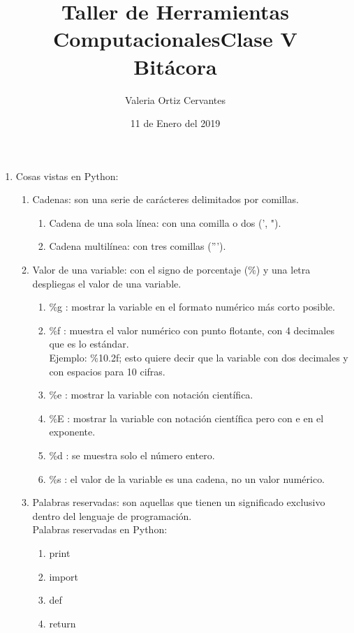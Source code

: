 \documentclass[letterpaper, 12pt, oneside]{article} %
\title{\Huge Taller de Herramientas Computacionales}
\author{Valeria Ortiz Cervantes}
\date{11 de Enero del 2019}
\begin{document}
	\maketitle
	\newpage
	\title{Clase V\\Bitácora\\}
	\begin{enumerate}
		\item Cosas vistas en Python:
		\begin{enumerate}
			\item Cadenas: son una serie de carácteres delimitados por comillas.
			\begin{enumerate}
				\item Cadena de una sola línea: con una comilla o dos (', ").
				\item Cadena multilínea: con tres comillas (''').
			\end{enumerate}
			\item Valor de una variable: con el signo de porcentaje ($\%$) y una letra despliegas el valor de una variable. 
			\begin{enumerate}
				\item $\%$g : mostrar la variable en el formato numérico más corto posible.
				\item $\%$f : muestra el valor numérico con punto flotante, con 4 decimales que es lo estándar.\\Ejemplo: $\%$10.2f; esto quiere decir que la variable con dos decimales y con espacios para 10 cifras.
				\item $\%$e : mostrar la variable con notación científica. 
				\item $\%$E : mostrar la variable con notación científica pero con e en el exponente.
				\item $\%$d : se muestra solo el número entero.
				\item $\%$s : el valor de la variable es una cadena, no un valor numérico.
			\end{enumerate}
			\item Palabras reservadas: son aquellas que tienen un significado exclusivo dentro del lenguaje de programación.\\Palabras reservadas en Python:
			\begin{enumerate}
				\item print
				\item import
				\item def
				\item return

\end{enumerate}
\end{enumerate}
\end{enumerate}
\end{document}
